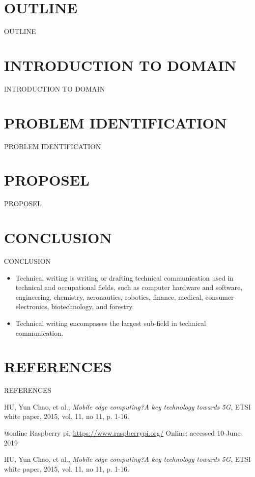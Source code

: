 \documentclass[svgnames,9pt]{beamer}
\begin{document}
\section{OUTLINE}
\begin{frame}{OUTLINE}
	\tableofcontents
\end{frame}
\section{INTRODUCTION TO DOMAIN}
\begin{frame}{INTRODUCTION TO DOMAIN}
\end{frame}

\section{PROBLEM IDENTIFICATION}
\begin{frame}{PROBLEM IDENTIFICATION}
\end{frame}
\section{PROPOSEL}
\begin{frame}{PROPOSEL}
\end{frame}
\section{CONCLUSION}
\begin{frame}{ CONCLUSION }	
\begin{itemize}
\item Technical writing is writing or drafting technical communication used in technical and occupational fields\cite{india}, such as computer hardware and software\cite{rpi}, engineering, chemistry, aeronautics, robotics, finance\cite{japan}, medical, consumer electronics, biotechnology, and forestry. 
\item Technical writing encompasses the largest sub-field in technical communication. 
\end{itemize}
\end{frame}
\section{REFERENCES}
\begin{frame}{REFERENCES}
\begin{thebibliography}{99}
	 HU, Yun Chao, et al., \emph{Mobile edge computing?A key technology
		towards 5G}, ETSI white paper, 2015, vol. 11, no 11, p. 1-16.
	
	
	@online{ Raspberry pi,
		\url{https://www.raspberrypi.org/}
		Online; accessed 10-June-2019
	}
	
	 HU, Yun Chao, et al., \emph{Mobile edge computing?A key technology
		towards 5G}, ETSI white paper, 2015, vol. 11, no 11, p. 1-16.		
\end{thebibliography}
\end{frame}
\end{document}
